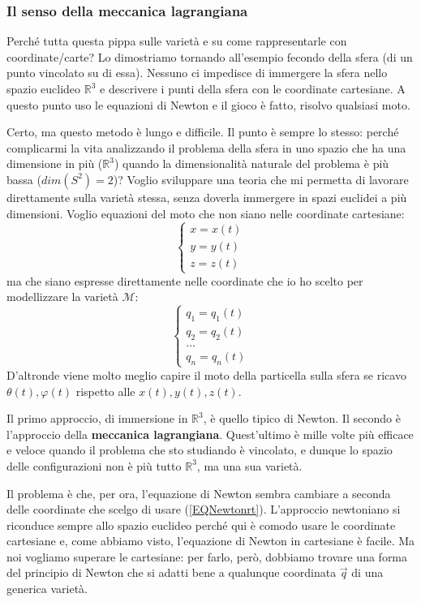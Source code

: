 \documentclass[a4paper,openany]{article}
\begin{document}
	\subsubsection{Il senso della meccanica lagrangiana}
	Perché tutta questa pippa sulle varietà e su come rappresentarle con coordinate/carte? Lo dimostriamo tornando all'esempio fecondo della sfera (di un punto vincolato su di essa). Nessuno ci impedisce di immergere la sfera nello spazio euclideo $\mathbb{R}^3$ e descrivere i punti della sfera con le coordinate cartesiane. A questo punto uso le equazioni di Newton e il gioco è fatto, risolvo qualsiasi moto.
	
	Certo, ma questo metodo è lungo e difficile. Il punto è sempre lo stesso: perché complicarmi la vita analizzando il problema della sfera in uno spazio che ha una dimensione in più ($\mathbb{R}^3$) quando la dimensionalità naturale del problema è più bassa ($dim(S^2)=2$)? Voglio sviluppare una teoria che mi permetta di lavorare direttamente sulla varietà stessa, senza doverla immergere in spazi euclidei a più dimensioni. Voglio equazioni del moto che non siano nelle coordinate cartesiane:
	\begin{equation}
		\begin{cases}
			x=x(t) \\
			y= y(t) \\
			z=z(t)
		\end{cases}
	\end{equation}
	ma che siano espresse direttamente nelle coordinate che io ho scelto per modellizzare la varietà $\mathcal{M}$:
	\begin{equation}
		\begin{cases}
			q_1=q_1(t) \\
			q_2= q_2(t) \\
			\dots \\
			q_n = q_n(t)
		\end{cases}
	\end{equation}
	D'altronde viene molto meglio capire il moto della particella sulla sfera se ricavo $\theta(t),\varphi(t)$ rispetto alle $x(t),y(t),z(t)$.
	
	Il primo approccio, di immersione in $\mathbb{R}^3$, è quello tipico di Newton. Il secondo è l'approccio della \textbf{meccanica lagrangiana}. Quest'ultimo è mille volte più efficace e veloce quando il problema che sto studiando è vincolato, e dunque lo spazio delle configurazioni non è più tutto $\mathbb{R}^3$, ma una sua varietà. 
	
	Il problema è che, per ora, l'equazione di Newton sembra cambiare a seconda delle coordinate che scelgo di usare (\ref{EQNewtonrt}). L'approccio newtoniano si riconduce sempre allo spazio euclideo perché qui è comodo usare le coordinate cartesiane e, come abbiamo visto, l'equazione di Newton in cartesiane è facile. Ma noi vogliamo superare le cartesiane: per farlo, però, dobbiamo trovare una forma del principio di Newton che si adatti bene a qualunque coordinata $\vec{q}$ di una generica varietà. 
\end{document}
